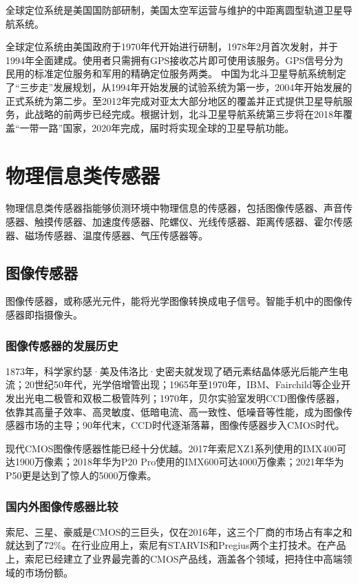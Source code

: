 \documentclass[lang=cn]{elegantpaper}
\begin{document}
全球定位系统是美国国防部研制，美国太空军运营与维护的中距离圆型轨道卫星导航系统。

全球定位系统由美国政府于1970年代开始进行研制，1978年2月首次发射，并于1994年全面建成。使用者只需拥有GPS接收芯片即可使用该服务。GPS信号分为民用的标准定位服务和军用的精确定位服务两类。
中国为北斗卫星导航系统制定了“三步走”发展规划，从1994年开始发展的试验系统为第一步，2004年开始发展的正式系统为第二步。至2012年完成对亚太大部分地区的覆盖并正式提供卫星导航服务，此战略的前两步已经完成。根据计划，北斗卫星导航系统第三步将在2018年覆盖“一带一路”国家，2020年完成，届时将实现全球的卫星导航功能。




\section{物理信息类传感器}

物理信息类传感器指能够侦测环境中物理信息的传感器，包括图像传感器、声音传感器、触摸传感器、加速度传感器、陀螺仪、光线传感器、距离传感器、霍尔传感器、磁场传感器、温度传感器、气压传感器等。

\subsection{图像传感器}

图像传感器，或称感光元件，能将光学图像转换成电子信号。智能手机中的图像传感器即指摄像头。

\subsubsection{图像传感器的发展历史}

1873年，科学家约瑟·美及伟洛比·史密夫就发现了硒元素结晶体感光后能产生电流；20世纪50年代，光学倍增管出现；1965年至1970年，IBM、Fairchild等企业开发出光电二极管和双极二极管阵列；1970年，贝尔实验室发明CCD图像传感器，依靠其高量子效率、高灵敏度、低暗电流、高一致性、低噪音等性能，成为图像传感器市场的主导；90年代末，CCD时代逐渐落幕，图像传感器步入CMOS时代。

现代CMOS图像传感器性能已经十分优越。2017年索尼XZ1系列使用的IMX400可达1900万像素；2018年华为P20 Pro使用的IMX600可达4000万像素；2021年华为P50更是达到了惊人的5000万像素。

\subsubsection{国内外图像传感器比较}

索尼、三星、豪威是CMOS的三巨头，仅在2016年，这三个厂商的市场占有率之和就达到了72\%。在行业应用上，索尼有STARVIS和Pregius两个主打技术。在产品上，索尼已经建立了业界最完善的CMOS产品线，涵盖各个领域，把持住中高端领域的市场份额。
\end{document}
